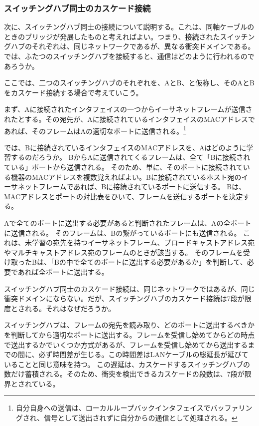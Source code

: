 \subsubsection{スイッチングハブ同士のカスケード接続}

次に、スイッチングハブ同士の接続について説明する。これは、同軸ケーブルのときのブリッジが発展したものと考えればよい。つまり、接続されたスイッチングハブのそれぞれは、同じネットワークであるが、異なる衝突ドメインである。では、ふたつのスイッチングハブを接続すると、通信はどのように行われるのであろうか。

ここでは、二つのスイッチングハブのそれぞれを、AとB、と仮称し、そのAとBをカスケード接続する場合で考えていこう。

まず、Aに接続されたインタフェイスの一つからイーサネットフレームが送信されたとする。その宛先が、Aに接続されているインタフェイスのMACアドレスであれば、そのフレームはAの適切なポートに送信される。\footnote{自分自身への送信は、ローカルループバックインタフェイスでバッファリングされ、信号として送出されずに自分からの通信として処理される。}

では、Bに接続されているインタフェイスのMACアドレスを、Aはどのように学習するのだろうか。
BからAに送信されてくるフレームは、全て「Bに接続されている」ポートから送信される。
そのため、単に、そのポートに接続されている機器のMACアドレスを複数覚えればよい。Bに接続されているホスト宛のイーサネットフレームであれば、Bに接続されているポートに送信する。
Bは、MACアドレスとポートの対比表をひいて、フレームを送信するポートを決定する。

Aで全てのポートに送出する必要があると判断されたフレームは、Aの全ポートに送信される。
そのフレームは、Bの繋がっているポートにも送信される。
これは、未学習の宛先を持つイーサネットフレーム、ブロードキャストアドレス宛やマルチキャストアドレス宛のフレームのときが該当する。
そのフレームを受け取ったBは、「Bの中で全てのポートに送出する必要があるか」を判断して、必要であれば全ポートに送出する。

スイッチングハブ同士のカスケード接続は、同じネットワークではあるが、同じ衝突ドメインにならない。だが、スイッチングハブのカスケード接続は7段が限度とされる。それはなぜだろうか。

スイッチングハブは、フレームの宛先を読み取り、どのポートに送出するべきかを判断してから適切なポートに送出する。フレームを受信し始めてからどの時点で送出するかでいくつか方式があるが、フレームを受信し始めてから送出するまでの間に、必ず時間差が生じる。この時間差はLANケーブルの総延長が延びていることと同じ意味を持つ。
この遅延は、カスケードするスイッチングハブの数だけ蓄積される。そのため、衝突を検出できるカスケードの段数は、7段が限界とされている。

